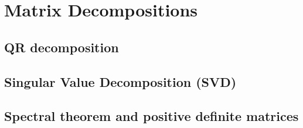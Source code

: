 
\section{Matrix Decompositions}

\subsection{QR decomposition}


\subsection{Singular Value Decomposition (SVD)}


\subsection{Spectral theorem and positive definite matrices}

